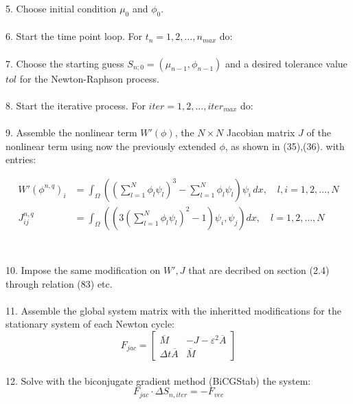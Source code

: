 \documentclass{article}
\begin{document}
5. Choose initial condition $\mu_0$ and $\phi_0$. \\\\

6. Start the time point loop. For $t_n = 1, 2, \ldots, n_{max}$ do:\\\\

7. Choose the starting guess $S_{n;0} = (\mu_{n-1}, \phi_{n-1})$ and a desired tolerance value $tol$ for the Newton-Raphson process.\\\\

8. Start the iterative process. For $iter = 1, 2, \ldots, iter_{max}$ do:\\\\

9. Assemble the nonlinear term $W'(\phi)$, the $N \times N$ Jacobian matrix $J$ of the nonlinear term using now the previously extended $\phi$, as shown in (35),(36). with entries:

\[
\begin{aligned}
W'({\phi}^{n,q})_i &= \int_{\Omega} ((\sum_{l=1}^N\phi_{l}\psi_{l})^3 - \sum_{l=1}^N\phi_{l}\psi_{l}) \psi_i \,dx, \quad l,i = 1, 2, \ldots, N \\
J_{ij}^{n,q} &= \int_{\Omega} ((3(\sum_{l=1}^N\phi_{l}\psi_{l})^2-1)\psi_{i},\psi_{j})dx, \quad l = 1, 2, \ldots, N \\    
\end{aligned}
\] \\\\ 

10. Impose the same modification on $W', J$ that are decribed on section (2.4) through relation (83) etc.\\\\

11. Assemble the global system matrix with the inheritted modifications for the stationary system of each Newton cycle:\\
\begin{equation}
 F_{jac} = \left[ 
    \begin{array}{cc} 
      \overline{M} & -J-\varepsilon^2\overline{A}  \\ 
      \Delta t \overline{A}  & \overline{M}
    \end{array} 
    \right]
\end{equation}\\

12. Solve with the biconjugate gradient method (BiCGStab) the system:\\
\begin{equation}
F_{jac}\cdot \Delta S_{n,iter} = - F_{vec}
\end{equation}\\\\
\end{document}
